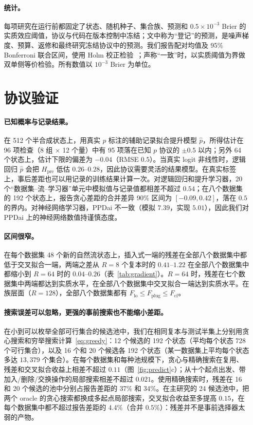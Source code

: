 \documentclass[runningheads]{llncs}
\newcommand{\Hpre}{H_{\mathrm{pre}}}
\begin{document}
\paragraph{统计。}每项研究在运行前都固定了状态、随机种子、集合族、预测和 $0.5\times10^{-3}$ Brier 的实质效应阈值，协议与代码在版本控制中冻结；文中称为“登记”的预测，是噪声梯度、预算、返修和最终研究冻结协议中的预测。我们报告配对均值及 95\% Bonferroni 联合区间，使用 Holm 校正检验~\cite{holm1979simple}；声称“一致”时，以实质阈值为界做双单侧等价检验。所有数值以 $10^{-3}$ Brier 为单位。

\section{协议验证}
\label{sec:validation}
\paragraph{已知概率与记录结果。}在 512 个半合成状态上，用真实 $p$ 标注的辅助记录拟合提升模型 $\hat p$，所得估计在 96 项检查（8 组 $\times$ 12 个量）中有 95 项落在已知 $p$ 协议的 $\pm0.5$ 以内；另外 64 个状态上，估计下限的偏差为 $-0.04$（RMSE $0.5$）。当真实 logit 非线性时，逻辑回归 $\hat p$ 会把 $\Hpre$ 低估 $0.26$--$0.28$，因此协议需要灵活的结果模型。在真实标签上，事后差距也可以用记录的训练结果计算一次。对逻辑回归和提升学习器，20 个“数据集--流--学习器”单元中模拟值与记录值都相差不超过 $0.54$；在八个数据集的 192 个状态上，报告贪心差距的合并差异 90\% 区间为 $[-0.09,0.42]$，落在 $0.5$ 的界内。对神经网络学习器，PPDai 不一致（模拟 $7.39$，实现 $5.01$），因此我们对 PPDai 上的神经网络数值持谨慎态度。

\paragraph{区间很窄。}在每个数据集 48 个新的自然流状态上，插入式一端的残差在全部八个数据集中都低于交叉拟合一端，两端之差从 $R=8$ 个复本时的 $0.41$--$1.22$ 在全部八个数据集中都缩小到 $R=64$ 时的 $0.04$--$0.26$（表~\ref{tab:gradient}）。$R=64$ 时，残差在七个数据集中两端都达到实质水平，在全部八个数据集中交叉拟合一端达到实质水平。在族层面（$R=128$），全部八个数据集都有 $F_{\mathrm{lo}}\le F_{\mathrm{plug}}\le F_{\mathrm{cf}}$。

\paragraph{搜索误差可以忽略，更强的事前搜索也不能缩小差距。}在小到可以枚举全部可行集合的候选池中，我们在相同复本与测试半集上分别用贪心搜索和穷举搜索计算~\eqref{eq:greedy}：12 个候选的 192 个状态（平均每个状态 728 个可行集合），以及 16 个和 20 个候选各 192 个状态（某一数据集上平均每个状态多达 $13{,}379$ 个集合）。在每个数据集和每种池规模下，贪心与精确搜索在复用、残差和交叉拟合收益上相差不超过 $0.11$（图~\ref{fig:predict}c）；从十个起点出发、带加入/删除/交换操作的局部搜索相差不超过 $0.021$。使用精确搜索时，残差在 16 和 20 个候选的池中分别占报告差距的 37\% 和 34\%。在主研究的 24 候选池中，把两个 oracle 的贪心搜索都换成多起点局部搜索，交叉拟合收益至多提高 $0.15$，在每个数据集中都不超过报告差距的 4.4\%（合并 $0.5\%$）：残差并不是事前选择器太弱的产物。
\end{document}
